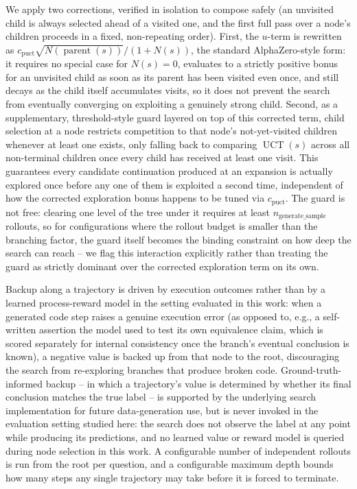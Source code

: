 We apply two corrections, verified in isolation to compose safely (an
unvisited child is always selected ahead of a visited one, and the first full
pass over a node's children proceeds in a fixed, non-repeating order). First,
the $u$-term is rewritten as $c_{\text{puct}}\sqrt{N(\operatorname{parent}(s))}
/ (1+N(s))$, the standard AlphaZero-style form: it requires no special case
for $N(s)=0$, evaluates to a strictly positive bonus for an unvisited child
as soon as its parent has been visited even once, and still decays as the
child itself accumulates visits, so it does not prevent the search from
eventually converging on exploiting a genuinely strong child. Second, as a
supplementary, threshold-style guard layered on top of this corrected term,
child selection at a node restricts competition to that node's not-yet-visited
children whenever at least one exists, only falling back to comparing
$\operatorname{UCT}(s)$ across all non-terminal children once every child has
received at least one visit. This guarantees every candidate continuation
produced at an expansion is actually explored once before any one of them is
exploited a second time, independent of how the corrected exploration bonus
happens to be tuned via $c_{\text{puct}}$. The guard is not free: clearing one
level of the tree under it requires at least $n_{\text{generate\_sample}}$
rollouts, so for configurations where the rollout budget is smaller than the
branching factor, the guard itself becomes the binding constraint on how deep
the search can reach -- we flag this interaction explicitly rather than
treating the guard as strictly dominant over the corrected exploration term
on its own.

Backup along a trajectory is driven by execution outcomes rather than by a
learned process-reward model in the setting evaluated in this work: when a
generated code step raises a genuine execution error (as opposed to, e.g., a
self-written assertion the model used to test its own equivalence claim,
which is scored separately for internal consistency once the branch's
eventual conclusion is known), a negative value is backed up from that node
to the root, discouraging the search from re-exploring branches that produce
broken code. Ground-truth-informed backup -- in which a trajectory's value is
determined by whether its final conclusion matches the true label -- is
supported by the underlying search implementation for future data-generation
use, but is never invoked in the evaluation setting studied here: the search
does not observe the label at any point while producing its predictions, and
no learned value or reward model is queried during node selection in this
work. A configurable number of independent rollouts is run from the root per
question, and a configurable maximum depth bounds how many steps any single
trajectory may take before it is forced to terminate.


